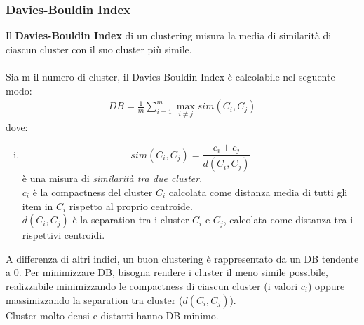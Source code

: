 \subsubsection{Davies-Bouldin Index}
Il \textbf{Davies-Bouldin Index} di un clustering misura la media di similarità di ciascun cluster con il suo cluster più simile.\\
\\
Sia m il numero di cluster, il Davies-Bouldin Index è calcolabile nel seguente modo:
\begin{align}
	DB = \frac{1}{m}\sum_{i=1}^{m}\max_{i \ne j}sim(C_i, C_j)
\end{align}
dove:
\begin{enumerate}[(i)]
	\item $$ sim(C_i, C_j) =  \frac{c_i + c_j}{d(C_i, C_j)}$$ è una misura di \textit{similarità tra due cluster}.\\
	$c_i$ è la compactness del cluster $C_i$ calcolata come distanza media di tutti gli item in $C_i$ rispetto al proprio centroide.\\
	$d(C_i, C_j)$ è la separation tra i cluster $C_i$ e $C_j$, calcolata come distanza tra i rispettivi centroidi.
\end{enumerate}
A differenza di altri indici, un buon clustering è rappresentato da un DB tendente a 0. Per minimizzare DB, bisogna rendere i cluster il meno simile possibile, realizzabile minimizzando le compactness di ciascun cluster (i valori $c_i$) oppure massimizzando la separation tra cluster ($d(C_i, C_j)$).\\
Cluster molto densi e distanti hanno DB minimo.

